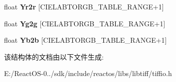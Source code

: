 \begin{DoxyCompactItemize}
\mbox{\label{struct_t_i_f_f_c_i_e_lab_to_r_g_b_ad63579e94a6a6935bac4efde5f1e28eb}} 
float {\bfseries Yr2r} \mbox{[}C\+I\+E\+L\+A\+B\+T\+O\+R\+G\+B\+\_\+\+T\+A\+B\+L\+E\+\_\+\+R\+A\+N\+GE+1\mbox{]}
\item 
\mbox{\label{struct_t_i_f_f_c_i_e_lab_to_r_g_b_adc3778d47f2b0d08abe3e38ca8025564}} 
float {\bfseries Yg2g} \mbox{[}C\+I\+E\+L\+A\+B\+T\+O\+R\+G\+B\+\_\+\+T\+A\+B\+L\+E\+\_\+\+R\+A\+N\+GE+1\mbox{]}
\item 
\mbox{\label{struct_t_i_f_f_c_i_e_lab_to_r_g_b_a242fa9e96b466a977bd12e8193edff53}} 
float {\bfseries Yb2b} \mbox{[}C\+I\+E\+L\+A\+B\+T\+O\+R\+G\+B\+\_\+\+T\+A\+B\+L\+E\+\_\+\+R\+A\+N\+GE+1\mbox{]}
\end{DoxyCompactItemize}


该结构体的文档由以下文件生成\+:\begin{DoxyCompactItemize}
\item 
E\+:/\+React\+O\+S-\/0../sdk/include/reactos/libs/libtiff/tiffio.\+h\end{DoxyCompactItemize}
